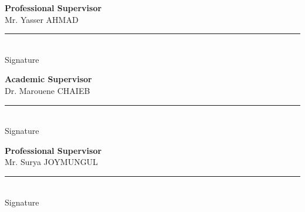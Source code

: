 \thispagestyle{empty}
\vspace*{2cm}

\noindent
\begin{minipage}[t]{0.48\textwidth}
\centering
{\sffamily\bfseries Professional Supervisor}\\[4pt]
Mr. Yasser AHMAD\\[2.4cm]
\rule{5.5cm}{0.4pt}\\[2pt]
{\small Signature}
\end{minipage}
\hfill
\begin{minipage}[t]{0.48\textwidth}
\centering
{\sffamily\bfseries Academic Supervisor}\\[4pt]
Dr. Marouene CHAIEB\\[2.4cm]
\rule{5.5cm}{0.4pt}\\[2pt]
{\small Signature}
\end{minipage}

\vspace{2.5cm}

\noindent
\begin{minipage}[t]{0.48\textwidth}
\centering
{\sffamily\bfseries Professional Supervisor}\\[4pt]
Mr. Surya JOYMUNGUL\\[2.4cm]
\rule{5.5cm}{0.4pt}\\[2pt]
{\small Signature}
\end{minipage}
\hfill
\begin{minipage}[t]{0.48\textwidth}
\end{minipage}

\newpage
